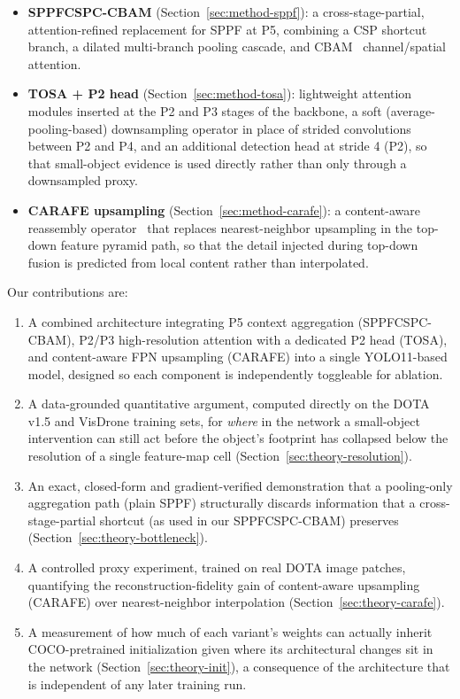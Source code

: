 \documentclass[conference]{IEEEtran}
\begin{document}
\begin{itemize}
  \item \textbf{SPPFCSPC-CBAM} (Section~\ref{sec:method-sppf}): a
  cross-stage-partial, attention-refined replacement for SPPF at P5,
  combining a CSP shortcut branch, a dilated multi-branch pooling cascade,
  and CBAM~\cite{woo2018cbam} channel/spatial attention.
  \item \textbf{TOSA + P2 head} (Section~\ref{sec:method-tosa}): lightweight
  attention modules inserted at the P2 and P3 stages of the backbone, a
  soft (average-pooling-based) downsampling operator in place of strided
  convolutions between P2 and P4, and an additional detection head at
  stride 4 (P2), so that small-object evidence is used directly rather than
  only through a downsampled proxy.
  \item \textbf{CARAFE upsampling} (Section~\ref{sec:method-carafe}): a
  content-aware reassembly operator~\cite{wang2019carafe} that replaces
  nearest-neighbor upsampling in the top-down feature pyramid path, so that
  the detail injected during top-down fusion is predicted from local
  content rather than interpolated.
\end{itemize}

Our contributions are:
\begin{enumerate}
  \item A combined architecture integrating P5 context aggregation (SPPFCSPC-CBAM),
  P2/P3 high-resolution attention with a dedicated P2 head (TOSA), and
  content-aware FPN upsampling (CARAFE) into a single YOLO11-based model,
  designed so each component is independently toggleable for ablation.
  \item A data-grounded quantitative argument, computed directly on the
  DOTA v1.5 and VisDrone training sets, for \emph{where} in the network a
  small-object intervention can still act before the object's footprint
  has collapsed below the resolution of a single feature-map cell
  (Section~\ref{sec:theory-resolution}).
  \item An exact, closed-form and gradient-verified demonstration that a
  pooling-only aggregation path (plain SPPF) structurally discards
  information that a cross-stage-partial shortcut (as used in our
  SPPFCSPC-CBAM) preserves (Section~\ref{sec:theory-bottleneck}).
  \item A controlled proxy experiment, trained on real DOTA image patches,
  quantifying the reconstruction-fidelity gain of content-aware upsampling
  (CARAFE) over nearest-neighbor interpolation (Section~\ref{sec:theory-carafe}).
  \item A measurement of how much of each variant's weights can actually
  inherit COCO-pretrained initialization given where its architectural
  changes sit in the network (Section~\ref{sec:theory-init}), a
  consequence of the architecture that is independent of any later
  training run.
\end{enumerate}
\end{document}

